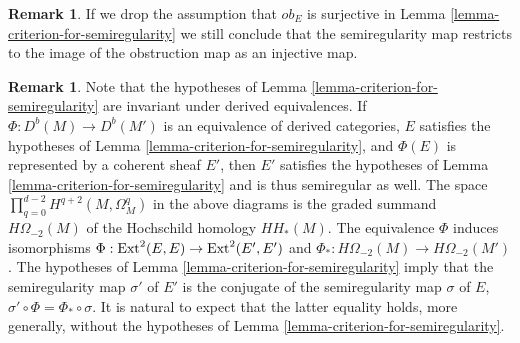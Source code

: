 \documentclass[12pt]{amsart}
\numberwithin{equation}{subsection}
\theoremstyle{plain}
\theoremstyle{definition}
\newtheorem{rem}[thm]{Remark}
\newcommand{\Ext}{{\rm Ext}}
\begin{document}
\begin{rem}
\label{remark-semiregularity-map-restricts-as-an-injective-map-to-the-image-of-ob}
If we drop the  assumption that $ob_E$ is surjective in Lemma \ref{lemma-criterion-for-semiregularity} we still conclude that the semiregularity map restricts to the image of the obstruction map as an injective map.
\end{rem}

\begin{rem}
\label{rem-derived-equivariance-of-semiregularity}
Note that the hypotheses of Lemma \ref{lemma-criterion-for-semiregularity}
are invariant under derived equivalences. If $\Phi:D^b(M)\rightarrow D^b(M')$ is an equivalence of derived categories, $E$ satisfies the hypotheses of Lemma \ref{lemma-criterion-for-semiregularity}, and $\Phi(E)$ is represented by a coherent sheaf $E'$, then $E'$ satisfies the hypotheses of Lemma \ref{lemma-criterion-for-semiregularity} and is thus semiregular as well. 
The space $\prod_{q= 0}^{d-2}H^{q+2}(M,\Omega^q_M)$ in the above diagrams is the graded summand $H\Omega_{-2}(M)$ of the Hochschild homology $HH_*(M)$.
The equivalence $\Phi$ induces isomorphisms $\Phi:\Ext^2(E,E)\rightarrow \Ext^2(E',E')$ and 
$\Phi_*:H\Omega_{-2}(M)\rightarrow H\Omega_{-2}(M')$. The hypotheses of Lemma \ref{lemma-criterion-for-semiregularity} imply 
that the semiregularity map $\sigma'$ of $E'$ is the conjugate of the semiregularity map $\sigma$ of $E$,
$\sigma'\circ\Phi=\Phi_*\circ\sigma$. It is natural to expect that the latter equality holds, more generally, without the hypotheses of Lemma \ref{lemma-criterion-for-semiregularity}.
\end{rem}
\end{document}
